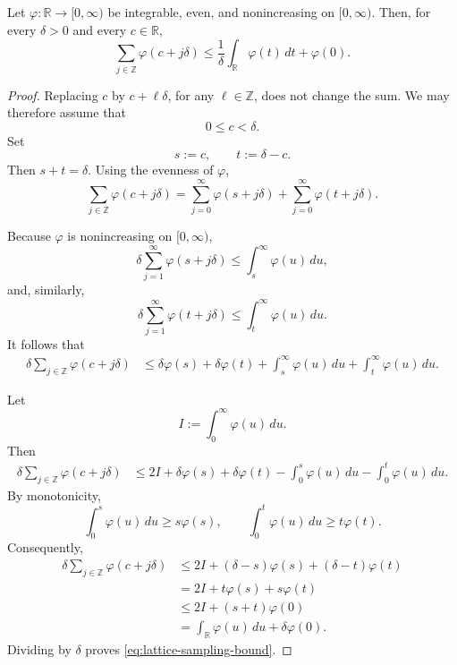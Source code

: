 \begin{lemma}
\label{lem:lattice-sampling}

Let $\varphi:\mathbb{R}\to[0,\infty)$ be integrable, even, and
nonincreasing on $[0,\infty)$. Then, for every $\delta>0$ and every
$c\in\mathbb{R}$,
\begin{equation}
    \sum_{j\in\mathbb{Z}}
    \varphi(c+j\delta)
    \leq
    \frac{1}{\delta}
    \int_{\mathbb{R}}\varphi(t)\,dt
    +
    \varphi(0).
    \label{eq:lattice-sampling-bound}
\end{equation}
\end{lemma}

\begin{proof}
Replacing $c$ by $c+\ell\delta$, for any $\ell\in\mathbb{Z}$, does
not change the sum. We may therefore assume that
\[
    0\leq c<\delta.
\]
Set
\[
    s:=c,
    \qquad
    t:=\delta-c.
\]
Then $s+t=\delta$. Using the evenness of $\varphi$,
\begin{equation}
    \sum_{j\in\mathbb{Z}}
    \varphi(c+j\delta)
    =
    \sum_{j=0}^{\infty}
    \varphi(s+j\delta)
    +
    \sum_{j=0}^{\infty}
    \varphi(t+j\delta).
    \label{eq:lattice-decomposition}
\end{equation}

Because $\varphi$ is nonincreasing on $[0,\infty)$,
\[
    \delta
    \sum_{j=1}^{\infty}
    \varphi(s+j\delta)
    \leq
    \int_s^\infty\varphi(u)\,du,
\]
and, similarly,
\[
    \delta
    \sum_{j=1}^{\infty}
    \varphi(t+j\delta)
    \leq
    \int_t^\infty\varphi(u)\,du.
\]
It follows that
\begin{align}
    \delta
    \sum_{j\in\mathbb{Z}}
    \varphi(c+j\delta)
    &\leq
    \delta\varphi(s)
    +
    \delta\varphi(t)
    +
    \int_s^\infty\varphi(u)\,du
    +
    \int_t^\infty\varphi(u)\,du.
    \label{eq:lattice-intermediate}
\end{align}

Let
\[
    I:=\int_0^\infty\varphi(u)\,du.
\]
Then
\begin{align}
    \delta
    \sum_{j\in\mathbb{Z}}
    \varphi(c+j\delta)
    &\leq
    2I
    +
    \delta\varphi(s)
    +
    \delta\varphi(t)
    -
    \int_0^s\varphi(u)\,du
    -
    \int_0^t\varphi(u)\,du.
    \label{eq:lattice-intermediate-two}
\end{align}
By monotonicity,
\[
    \int_0^s\varphi(u)\,du
    \geq
    s\varphi(s),
    \qquad
    \int_0^t\varphi(u)\,du
    \geq
    t\varphi(t).
\]
Consequently,
\begin{align}
    \delta
    \sum_{j\in\mathbb{Z}}
    \varphi(c+j\delta)
    &\leq
    2I
    +
    (\delta-s)\varphi(s)
    +
    (\delta-t)\varphi(t)
    \nonumber\\
    &=
    2I
    +
    t\varphi(s)
    +
    s\varphi(t)
    \nonumber\\
    &\leq
    2I
    +
    (s+t)\varphi(0)
    \nonumber\\
    &=
    \int_{\mathbb{R}}\varphi(u)\,du
    +
    \delta\varphi(0).
    \label{eq:lattice-final}
\end{align}
Dividing by $\delta$ proves
\eqref{eq:lattice-sampling-bound}.
\end{proof}


